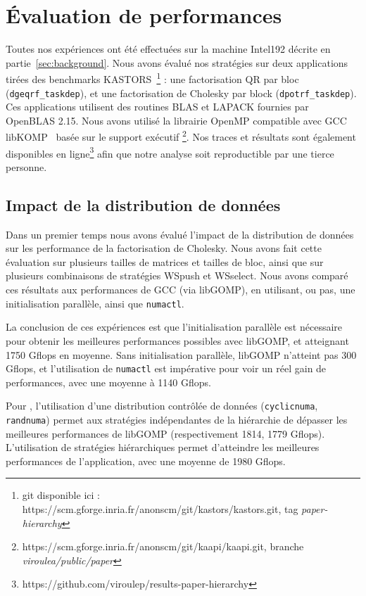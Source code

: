 \documentclass[parallelisme]{compas2016}
\begin{document}
\vspace*{-1ex}
\section{Évaluation de performances}
\label{sec:performances-evaluation}
Toutes nos expériences ont été effectuées sur la machine Intel192 décrite en partie~\ref{sec:background}.
Nous avons évalué nos stratégies sur deux applications tirées des benchmarks
KASTORS~\cite{virouleau:hal-01081974}\footnote{git disponible ici : https://scm.gforge.inria.fr/anonscm/git/kastors/kastors.git, tag \emph{paper-hierarchy}} :
une factorisation QR par bloc (\verb/dgeqrf_taskdep/), et une factorisation de
Cholesky par block (\verb/dpotrf_taskdep/).
Ces applications utilisent des routines BLAS et LAPACK fournies par OpenBLAS 2.15.
Nous avons utilisé la librairie OpenMP compatible avec GCC libKOMP~\cite{libkomp} basée
sur le support exécutif \kaapi\footnote{https://scm.gforge.inria.fr/anonscm/git/kaapi/kaapi.git,
branche \emph{viroulea/public/paper}}.
Nos traces et résultats sont également disponibles en ligne\footnote{https://github.com/viroulep/results-paper-hierarchy} afin que notre analyse
soit reproductible par une tierce personne.


\subsection{Impact de la distribution de données}

Dans un premier temps nous avons évalué l'impact de la distribution de données sur
les performance de la factorisation de Cholesky. Nous avons fait cette évaluation sur plusieurs
tailles de matrices et tailles de bloc, ainsi que sur plusieurs combinaisons
de stratégies WSpush et WSselect. Nous avons comparé ces résultats aux performances de GCC (via libGOMP),
en utilisant, ou pas, une initialisation parallèle, ainsi que \verb/numactl/.

La conclusion de ces expériences est que l'initialisation parallèle est nécessaire
pour obtenir les meilleures performances possibles avec libGOMP, et atteignant 1750 Gflops en moyenne.
Sans initialisation parallèle, libGOMP n'atteint pas 300 Gflops, et l'utilisation de
\verb/numactl/ est impérative pour voir un réel gain de performances, avec une moyenne à 1140 Gflops.

Pour \kaapi, l'utilisation d'une distribution contrôlée de données (\verb/cyclicnuma/,
\verb/randnuma/) permet aux stratégies indépendantes de la hiérarchie de dépasser
les meilleures performances de libGOMP (respectivement 1814, 1779 Gflops).
L'utilisation de stratégies hiérarchiques permet d'atteindre les meilleures performances
de l'application, avec une moyenne de 1980 Gflops.
\end{document}
